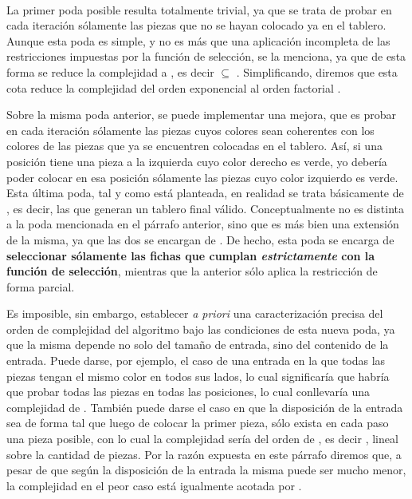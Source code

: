 \documentclass[11pt, a4paper, twoside]{article}
\begin{document}
\begin{paragraph}\

\label{poda:ej3-seleccion}

La primer poda posible resulta totalmente trivial, ya que se trata de probar
en cada iteración sólamente las piezas que no se hayan colocado ya en el
tablero. Aunque esta poda es simple, y no es más que una aplicación incompleta
de las restricciones impuestas por la función de selección, se la menciona, ya
que de esta forma se reduce la complejidad a
, es decir 
$\subseteq$ . Simplificando, diremos que esta cota reduce la
complejidad del orden exponencial  al orden factorial .

Sobre la misma poda anterior, se puede implementar una mejora, que es probar
en cada iteración sólamente las piezas cuyos colores sean coherentes con los
colores de las piezas que ya se encuentren colocadas en el tablero. Así, si
una posición tiene una pieza a la izquierda cuyo color derecho es verde, yo
debería poder colocar en esa posición sólamente las piezas cuyo color
izquierdo es verde. Esta última poda, tal y como está planteada, en realidad
se trata básicamente de \textbf{}, es decir, las que generan un
tablero final válido. Conceptualmente no es distinta a la poda mencionada en
el párrafo anterior, sino que es más bien una extensión de la misma, ya que
las dos se encargan de . De hecho, esta poda
se encarga de \textbf{seleccionar sólamente las fichas que cumplan
\emph{estrictamente} con la función de selección}, mientras que la anterior
sólo aplica la restricción de forma parcial.

Es imposible, sin embargo, establecer \emph{a priori} una caracterización
precisa del orden de complejidad del algoritmo bajo las condiciones de esta
nueva poda, ya que la misma depende no solo del tamaño de entrada, sino del
contenido de la entrada. Puede darse, por ejemplo, el caso de una entrada en la
que todas las piezas tengan el mismo color en todos sus lados, lo cual
significaría que habría que probar todas las piezas en todas las posiciones, lo
cual conllevaría una complejidad de . También puede darse el caso en
que la disposición de la entrada sea de forma tal que luego de colocar la primer
pieza, sólo exista en cada paso una pieza posible, con lo cual la complejidad
sería del orden de , es decir , lineal sobre la
cantidad de piezas. Por la razón expuesta en este párrafo diremos que, a pesar
de que según la disposición de la entrada la misma puede ser mucho menor, la
complejidad en el peor caso está igualmente acotada por .


\end{paragraph}
\end{document}
